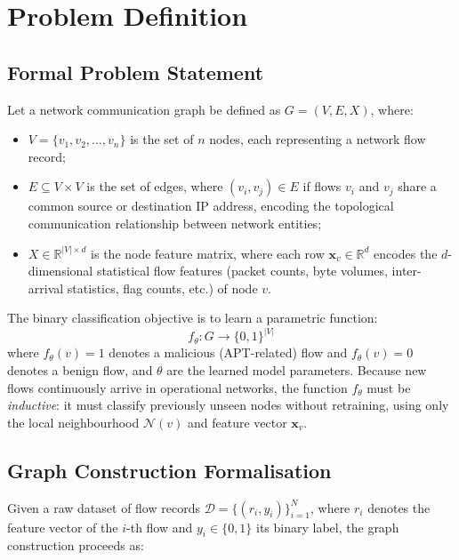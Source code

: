 \documentclass[conference]{IEEEtran}
\begin{document}
\section{Problem Definition}

\subsection{Formal Problem Statement}

Let a network communication graph be defined as $G = (V, E, X)$, where:
\begin{itemize}
    \item $V = \{v_1, v_2, \ldots, v_n\}$ is the set of $n$ nodes, each
    representing a network flow record;
    \item $E \subseteq V \times V$ is the set of edges, where $(v_i, v_j) \in E$
    if flows $v_i$ and $v_j$ share a common source or destination IP address,
    encoding the topological communication relationship between network entities;
    \item $X \in \mathbb{R}^{|V| \times d}$ is the node feature matrix, where
    each row $\mathbf{x}_v \in \mathbb{R}^d$ encodes the $d$-dimensional
    statistical flow features (packet counts, byte volumes, inter-arrival
    statistics, flag counts, etc.) of node $v$.
\end{itemize}

The binary classification objective is to learn a parametric function:
\begin{equation}
f_\theta: G \rightarrow \{0, 1\}^{|V|}
\label{eq:problem}
\end{equation}
where $f_\theta(v) = 1$ denotes a malicious (APT-related) flow and
$f_\theta(v) = 0$ denotes a benign flow, and $\theta$ are the learned model
parameters. Because new flows continuously arrive in operational networks,
the function $f_\theta$ must be \textit{inductive}: it must classify previously
unseen nodes without retraining, using only the local neighbourhood
$\mathcal{N}(v)$ and feature vector $\mathbf{x}_v$.

\subsection{Graph Construction Formalisation}

Given a raw dataset of flow records $\mathcal{D} = \{(r_i, y_i)\}_{i=1}^N$,
where $r_i$ denotes the feature vector of the $i$-th flow and
$y_i \in \{0, 1\}$ its binary label, the graph construction proceeds as:
\end{document}
